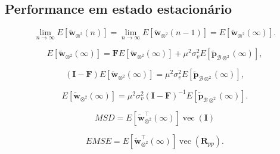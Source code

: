 \subsection{Performance em estado estacionário}

\begin{equation}
    \lim_{n\rightarrow\infty} E\left[ \tilde{\mathbf{w}}_{\otimes^2}(n)\right] = \lim_{n\rightarrow\infty} E\left[ \tilde{\mathbf{w}}_{\otimes^2}(n-1)\right] = E\left[ \tilde{\mathbf{w}}_{\otimes^2}(\infty)\right].
\end{equation}

\begin{equation}
    E\left[ \tilde{\mathbf{w}}_{\otimes^2}(\infty)\right]  = \mathbf{F}E\left[ \tilde{\mathbf{w}}_{\otimes^2}(\infty) \right] +\mu^2 \sigma_{v}^2E\left[ \tilde{\mathbf{p}}_{\mathcal{B}\otimes^2}(\infty) \right],
\end{equation}

\begin{equation}
    (\mathbf{I} - \mathbf{F})E\left[ \tilde{\mathbf{w}}_{\otimes^2}(\infty)\right]  =\mu^2 \sigma_{v}^2E\left[ \tilde{\mathbf{p}}_{\mathcal{B}\otimes^2}(\infty) \right],
\end{equation}

\begin{equation}
    E\left[ \tilde{\mathbf{w}}_{\otimes^2}(\infty)\right]  =\mu^2 \sigma_{v}^2(\mathbf{I} - \mathbf{F})^{-1}E\left[ \tilde{\mathbf{p}}_{\mathcal{B}\otimes^2}(\infty) \right].
\end{equation}

\begin{equation}
    MSD = E\left[ \tilde{\mathbf{w}}^\top_{\otimes^2}(\infty)\right]\operatorname{vec}(\mathbf{I})
\end{equation}

\begin{equation}
    EMSE = E\left[ \tilde{\mathbf{w}}^\top_{\otimes^2}(\infty)\right]\operatorname{vec}(\mathbf{R}_{pp}).
\end{equation}